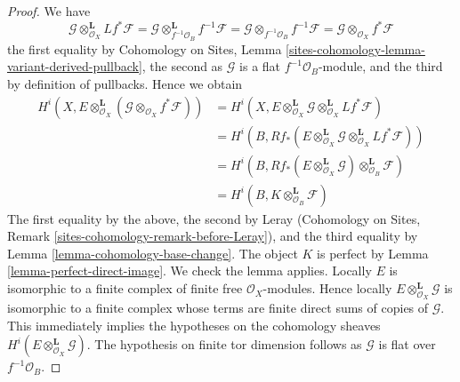 \begin{proof}
We have
$$
\mathcal{G} \otimes_{\mathcal{O}_X}^\mathbf{L} Lf^*\mathcal{F} =
\mathcal{G} \otimes_{f^{-1}\mathcal{O}_B}^\mathbf{L} f^{-1}\mathcal{F} =
\mathcal{G} \otimes_{f^{-1}\mathcal{O}_B} f^{-1}\mathcal{F} =
\mathcal{G} \otimes_{\mathcal{O}_X} f^*\mathcal{F}
$$
the first equality by
Cohomology on Sites, Lemma
\ref{sites-cohomology-lemma-variant-derived-pullback},
the second as $\mathcal{G}$ is a flat $f^{-1}\mathcal{O}_B$-module, and
the third by definition of pullbacks. Hence we obtain
\begin{align*}
H^i(X, E \otimes^\mathbf{L}_{\mathcal{O}_X}
(\mathcal{G} \otimes_{\mathcal{O}_X} f^*\mathcal{F}))
& =
H^i(X, E \otimes^\mathbf{L}_{\mathcal{O}_X} \mathcal{G}
\otimes_{\mathcal{O}_X}^\mathbf{L} Lf^*\mathcal{F}) \\
& =
H^i(B,
Rf_*(E \otimes^\mathbf{L}_{\mathcal{O}_X} \mathcal{G}
\otimes^\mathbf{L}_{\mathcal{O}_X} Lf^*\mathcal{F})) \\
& =
H^i(B,
Rf_*(E \otimes^\mathbf{L}_{\mathcal{O}_X} \mathcal{G})
\otimes^\mathbf{L}_{\mathcal{O}_B} \mathcal{F}) \\
& =
H^i(B, K \otimes^\mathbf{L}_{\mathcal{O}_B} \mathcal{F})
\end{align*}
The first equality by the above, the second by Leray
(Cohomology on Sites, Remark \ref{sites-cohomology-remark-before-Leray}), and
the third equality by Lemma \ref{lemma-cohomology-base-change}.
The object $K$ is perfect by Lemma \ref{lemma-perfect-direct-image}.
We check the lemma applies. Locally $E$ is isomorphic to a finite complex
of finite free $\mathcal{O}_X$-modules. Hence locally
$E \otimes^\mathbf{L}_{\mathcal{O}_X} \mathcal{G}$ is isomorphic to
a finite complex whose terms are finite direct sums of copies of $\mathcal{G}$.
This immediately implies the hypotheses on the cohomology sheaves
$H^i(E \otimes^\mathbf{L}_{\mathcal{O}_X} \mathcal{G})$.
The hypothesis on finite tor dimension follows as $\mathcal{G}$
is flat over $f^{-1}\mathcal{O}_B$.


\end{proof}
